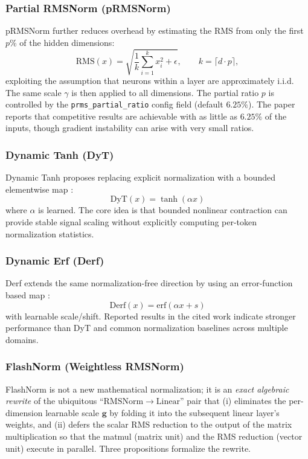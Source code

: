 \subsubsection{Partial RMSNorm (pRMSNorm)}
pRMSNorm \citep{zhang_root_2019} further reduces overhead by estimating the RMS from only the first $p$\% of the hidden dimensions:
\[
\mathrm{RMS}(x)=\sqrt{\frac{1}{k}\sum_{i=1}^{k}x_i^2+\epsilon},\qquad k=\lceil d\cdot p\rceil,
\]
exploiting the assumption that neurons within a layer are approximately i.i.d. The same scale $\gamma$ is then applied to all dimensions. The partial ratio $p$ is controlled by the \texttt{prms\_partial\_ratio} config field (default $6.25\%$). The paper reports that competitive results are achievable with as little as $6.25\%$ of the inputs, though gradient instability can arise with very small ratios.

\subsubsection{Dynamic Tanh (DyT)}
Dynamic Tanh proposes replacing explicit normalization with a bounded elementwise map \citep{zhu_transformers_2025}:
\[
\mathrm{DyT}(x)=\tanh(\alpha x)
\]
where $\alpha$ is learned. The core idea is that bounded nonlinear contraction can provide stable signal scaling without explicitly computing per-token normalization statistics.

\subsubsection{Dynamic Erf (Derf)}
Derf extends the same normalization-free direction by using an error-function based map \citep{chen_stronger_2025}:
\[
\mathrm{Derf}(x)=\mathrm{erf}(\alpha x+s)
\]
with learnable scale/shift. Reported results in the cited work indicate stronger performance than DyT and common normalization baselines across multiple domains.

\subsubsection{FlashNorm (Weightless RMSNorm)}
FlashNorm \citep{graef2026flashnorm} is not a new mathematical normalization; it is an \emph{exact algebraic rewrite} of the ubiquitous ``$\mathrm{RMSNorm} \to \mathrm{Linear}$'' pair that (i) eliminates the per-dimension learnable scale $\mathbf{g}$ by folding it into the subsequent linear layer's weights, and (ii) defers the scalar RMS reduction to the output of the matrix multiplication so that the matmul (matrix unit) and the RMS reduction (vector unit) execute in parallel. Three propositions formalize the rewrite.

